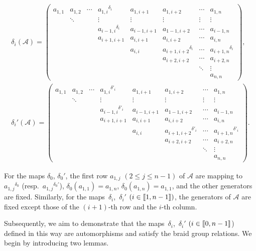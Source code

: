 \documentclass[pdftex]{sigma}
\numberwithin{equation}{section}
\def\d{\delta}
\def\A{\mathscr{A}}
\def\lbb#1{\left[\kern-0.15em\left[ {#1} \right] \kern-0.15em\right]}
\begin{document}
\begin{gather*}%
\d_i(\A)=
\begin{pmatrix}
 a_{1,1} &a_{1,2} & \cdots & {a_{1,i}}^{\d_i} & a_{1,i+1} & a_{1,i+2}& \cdots & a_{1,n} \\
 &\ddots & &\vdots & \vdots & \vdots & \vdots & \vdots\\
 & & & {a_{i-1,i}}^{\d_i} & a_{i-1,i+1} & a_{1-1,i+2}& \cdots & a_{i-1,n} \\
 & & &a_{i+1,i+1}& a_{i,i+1} & a_{i,i+2} &\cdots & a_{i,n} \\
 & & & & a_{i,i} & {a_{i+1,i+2}}^{\d_i}& \cdots & {a_{i+1,n}}^{\d_i} \\
 & & & & & a_{i+2,i+2}& \cdots & a_{i+2,n}\\
 & & & & & &\ddots & \vdots\\
 & & & & & & & a_{n,n}
\end{pmatrix}
,\\
\d_i'(\A)=
\begin{pmatrix}
 a_{1,1} &a_{1,2} & \cdots & {a_{1,i}}^{\d'_i} & a_{1,i+1} & a_{1,i+2}& \cdots & a_{1,n} \\
 &\ddots & &\vdots & \vdots & \vdots & \vdots & \vdots\\
 & & & {a_{i-1,i}}^{\d'_i} & a_{i-1,i+1} & a_{1-1,i+2}& \cdots & a_{i-1,n} \\
 & & &a_{i+1,i+1}& a_{i,i+1} & a_{i,i+2} &\cdots & a_{i,n} \\
 & & & & a_{i,i} & {a_{i+1,i+2}}^{\d'_i}& \cdots & {a_{i+1,n}}^{\d'_i} \\
 & & & & & a_{i+2,i+2}& \cdots & a_{i+2,n}\\
 & & & & & &\ddots & \vdots\\
 & & & & & & & a_{n,n}
\end{pmatrix}
.
\end{gather*}


For the maps $\delta_0$, $ \delta_0'$, the first row $a_{1,j}$ $(2\leq j\leq n-1)$ of $\A$ are mapping to ${a_{1,j}}^{\delta_0}$ \big(resp.~${a_{1,j}}^{\delta_0'}$\big), $\delta_0(a_{1,1})=a_{1,n}$, $\delta_0(a_{1,n})=a_{1, 1}$, and the other generators are fixed.
Similarly, for the maps~$\d_i$,~$\d_i'$ $(i \in \lbb{1,n-1})$, the generators of $\A$ are fixed except those of the $(i+1)$-th row and the $i$-th column.

Subsequently, we aim to demonstrate that the maps~$\d_i$,~$\d_i'$ $(i \in \lbb{0,n-1}$) defined in this way are automorphisms and satisfy the braid group relations.
We begin by introducing two lemmas.
\end{document}
